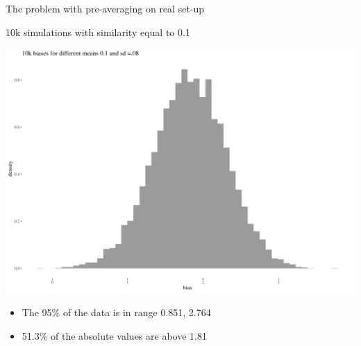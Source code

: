 \documentclass[
  10pt,
  ignorenonframetext,
  x11names, dvipsnames, bibspacing,natbib]{beamer}
\providecommand{\tightlist}{%
  \setlength{\itemsep}{0pt}\setlength{\parskip}{0pt}}
\begin{document}
\begin{frame}{The problem with pre-averaging on real set-up}
\protect\hypertarget{the-problem-with-pre-averaging-on-real-set-up-2}{}
\begin{block}{10k simulations with similarity equal to 0.1}
\protect\hypertarget{k-simulations-with-similarity-equal-to-0.1}{}
\vspace{1mm}
\footnotesize

\begin{center}\includegraphics[width=0.8\linewidth]{presentationBoston_files/figure-beamer/unnamed-chunk-11-1} \end{center}
\vspace{1mm}
\footnotesize

\normalsize
\pause

\footnotesize

\vspace{-2mm}

\begin{itemize}
\tightlist
\item
  The 95\% of the data is in range 0.851, 2.764
\item
  51.3\% of the absolute values are above 1.81
\end{itemize}
\end{block}
\end{frame}
\end{document}
